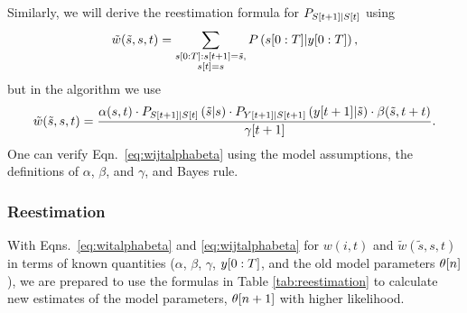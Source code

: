 Similarly, we will derive the reestimation formula for
$P_{{S}{[t+1]}|{S}{[t]}}$ using
\begin{equation}
  \label{eq:wijtFFE}
  {\tilde w}({\tilde s},s,t) = \sum_{\substack{s[0:T]:{s}{[t+1]}={\tilde s},\\{s}{[t]}=s}}
  P \left(s[0:T]|y[0:T] \right),
\end{equation}
but in the algorithm we use
\begin{equation}
  \label{eq:wijtalphabeta}
  {\tilde w}({\tilde s},s,t) = \frac{ \alpha(s,t) \cdot P_{{S}{[t+1]}|{S}{[t]}}
    \left({\tilde s}|s \right)  \cdot P_{{Y}{[t+1]}|{S}{[t+1]}}
    \left({y}{[t+1]}|{\tilde s} \right) \cdot \beta({\tilde s},t+t) }
  {{\gamma}{[t+1]}}.
\end{equation}
One can verify Eqn.~\eqref{eq:wijtalphabeta} using the model
assumptions, the definitions of $\alpha$, $\beta$, and $\gamma$, and
Bayes rule.

\subsubsection{Reestimation}

With Eqns.~\eqref{eq:witalphabeta} and \eqref{eq:wijtalphabeta} for
$w(i,t)$ and ${\tilde w}({\tilde s},s,t)$ in terms of known quantities
($\alpha$, $\beta$, $\gamma$, $y[0:T]$, and the old model
parameters ${\theta}{[n]}$), we are prepared to use the formulas
in Table \ref{tab:reestimation} to calculate new estimates of the
model parameters, ${\theta}{[n+1]}$ with higher likelihood.

